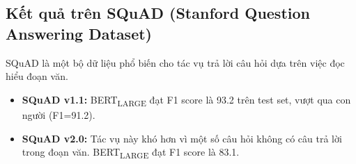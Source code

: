 \begin{table}[H]
    \centering
    \caption{Kết quả của BERT so với các mô hình khác trên GLUE test set. Các kết quả được lấy từ \cite{devlin2018bert}. BERT\textsubscript{LARGE} đạt điểm trung bình GLUE là 80.5.}
    \label{tab:glue_results}
\end{table}

\subsection{Kết quả trên SQuAD (Stanford Question Answering Dataset)}
\label{ssec:ket_qua_squad}
SQuAD là một bộ dữ liệu phổ biến cho tác vụ trả lời câu hỏi dựa trên việc đọc hiểu đoạn văn.
\begin{itemize}
    \item \textbf{SQuAD v1.1:} BERT\textsubscript{LARGE} đạt F1 score là 93.2 trên test set, vượt qua con người (F1=91.2).
    \item \textbf{SQuAD v2.0:} Tác vụ này khó hơn vì một số câu hỏi không có câu trả lời trong đoạn văn. BERT\textsubscript{LARGE} đạt F1 score là 83.1.
\end{itemize}

